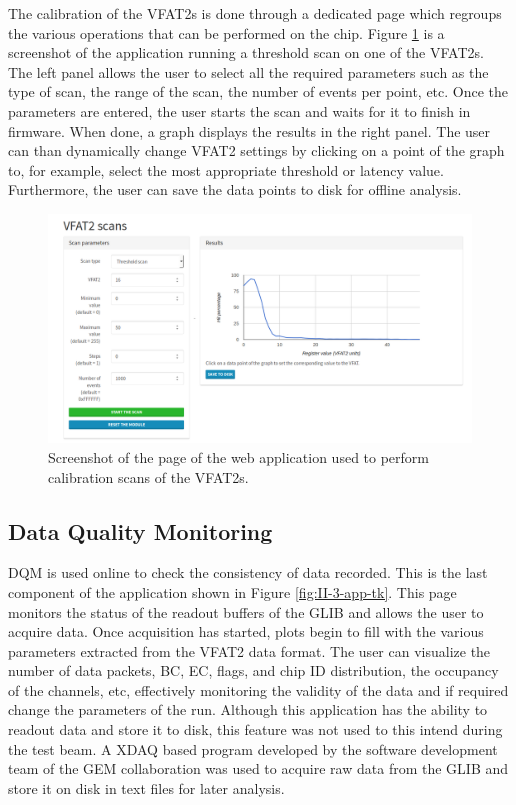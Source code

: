       The calibration of the VFAT2s is done through a dedicated page which regroups the various operations that can be performed on the chip. Figure \ref{fig:II-3-app-calibration} is a screenshot of the application running a threshold scan on one of the VFAT2s. The left panel allows the user to select all the required parameters such as the type of scan, the range of the scan, the number of events per point, etc. Once the parameters are entered, the user starts the scan and waits for it to finish in firmware. When done, a graph displays the results in the right panel. The user can than dynamically change VFAT2 settings by clicking on a point of the graph to, for example, select the most appropriate threshold or latency value. Furthermore, the user can save the data points to disk for offline analysis.

      \begin{figure}[h!]
        \centering
        \includegraphics[width=\textwidth]{img/II-3-test-beam/app-scan.png}
        \caption{Screenshot of the page of the web application used to perform calibration scans of the VFAT2s.}
        \label{fig:II-3-app-calibration}
      \end{figure}

    \subsection{Data Quality Monitoring}

      DQM is used online to check the consistency of data recorded. This is the last component of the application shown in Figure \ref{fig:II-3-app-tk}. This page monitors the status of the readout buffers of the GLIB and allows the user to acquire data. Once acquisition has started, plots begin to fill with the various parameters extracted from the VFAT2 data format. The user can visualize the number of data packets, BC, EC, flags, and chip ID distribution, the occupancy of the channels, etc, effectively monitoring the validity of the data and if required change the parameters of the run. Although this application has the ability to readout data and store it to disk, this feature was not used to this intend during the test beam. A XDAQ based program developed by the software development team of the GEM collaboration was used to acquire raw data from the GLIB and store it on disk in text files for later analysis.

